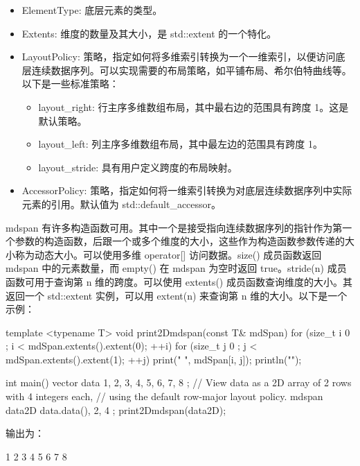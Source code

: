 \begin{itemize}
\item
ElementType: 底层元素的类型。

\item
Extents: 维度的数量及其大小，是 std::extent 的一个特化。

\item
LayoutPolicy: 策略，指定如何将多维索引转换为一个一维索引，以便访问底层连续数据序列。可以实现需要的布局策略，如平铺布局、希尔伯特曲线等。以下是一些标准策略：
\begin{itemize}
\item
layout\_right: 行主序多维数组布局，其中最右边的范围具有跨度 1。这是默认策略。

\item
layout\_left: 列主序多维数组布局，其中最左边的范围具有跨度 1。

\item
layout\_stride: 具有用户定义跨度的布局映射。
\end{itemize}

\item
AccessorPolicy: 策略，指定如何将一维索引转换为对底层连续数据序列中实际元素的引用。默认值为 std::default\_accessor。
\end{itemize}

mdspan 有许多构造函数可用。其中一个是接受指向连续数据序列的指针作为第一个参数的构造函数，后跟一个或多个维度的大小，这些作为构造函数参数传递的大小称为动态大小。可以使用多维 operator[] 访问数据。size() 成员函数返回 mdspan 中的元素数量，而 empty() 在 mdspan 为空时返回 true。stride(n) 成员函数可用于查询第 n 维的跨度。可以使用 extents() 成员函数查询维度的大小。其返回一个 std::extent 实例，可以用 extent(n) 来查询第 n 维的大小。以下是一个示例：

\begin{cpp}
template <typename T> void print2Dmdspan(const T& mdSpan)
{
    for (size_t i { 0 }; i < mdSpan.extents().extent(0); ++i) {
        for (size_t j { 0 }; j < mdSpan.extents().extent(1); ++j) {
            print("{} ", mdSpan[i, j]);
        }
        println("");
    }
}

int main()
{
    vector data { 1, 2, 3, 4, 5, 6, 7, 8 };
    // View data as a 2D array of 2 rows with 4 integers each,
    // using the default row-major layout policy.
    mdspan data2D { data.data(), 2, 4 };
    print2Dmdspan(data2D);
}
\end{cpp}

输出为：

\begin{shell}
1 2 3 4
5 6 7 8
\end{shell}

